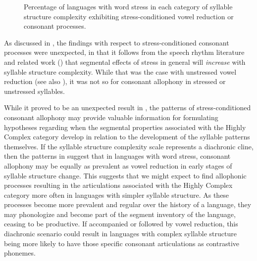   
\begin{figure}
\caption{\label{fig:7.1}Percentage of languages with word stress in each category of syllable structure complexity exhibiting stress-conditioned vowel reduction or consonant processes.}
\end{figure}

As discussed in , the findings with respect to stress-conditioned consonant processes were unexpected, in that it follows from the speech rhythm literature and related work (\citealt{BybeeEtAl1998,Schiering2007}) that segmental effects of stress in general will \textit{increase} with syllable structure complexity. While that was the case with unstressed vowel reduction (see also ), it was not so for consonant allophony in stressed or unstressed syllables.

  While it proved to be an unexpected result in , the patterns of stress-conditioned consonant allophony may provide valuable information for formulating hypotheses regarding when the segmental properties associated with the Highly Complex category develop in relation to the development of the syllable patterns themselves. If the syllable structure complexity scale represents a diachronic cline, then the patterns in  suggest that in languages with word stress, consonant allophony may be equally as prevalent as vowel reduction in early stages of syllable structure change. This suggests that we might expect to find allophonic processes resulting in the articulations associated with the Highly Complex category more often in languages with simpler syllable structure. As these processes become more prevalent and regular over the history of a language, they may phonologize and become part of the segment inventory of the language, ceasing to be productive. If accompanied or followed by vowel reduction, this diachronic scenario could result in languages with complex syllable structure being more likely to have those specific consonant articulations as contrastive phonemes.

